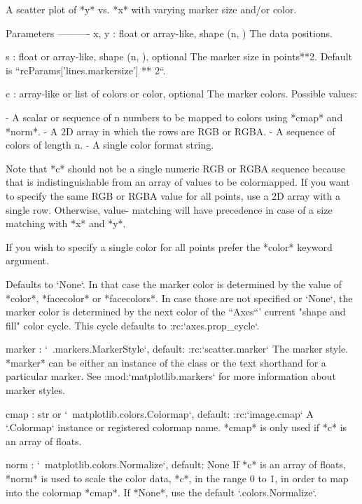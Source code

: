 \begin{DoxyVerb}
\begin{DoxyVerb}A scatter plot of *y* vs. *x* with varying marker size and/or color.

Parameters
----------
x, y : float or array-like, shape (n, )
    The data positions.

s : float or array-like, shape (n, ), optional
    The marker size in points**2.
    Default is ``rcParams['lines.markersize'] ** 2``.

c : array-like or list of colors or color, optional
    The marker colors. Possible values:

    - A scalar or sequence of n numbers to be mapped to colors using
      *cmap* and *norm*.
    - A 2D array in which the rows are RGB or RGBA.
    - A sequence of colors of length n.
    - A single color format string.

    Note that *c* should not be a single numeric RGB or RGBA sequence
    because that is indistinguishable from an array of values to be
    colormapped. If you want to specify the same RGB or RGBA value for
    all points, use a 2D array with a single row.  Otherwise, value-
    matching will have precedence in case of a size matching with *x*
    and *y*.

    If you wish to specify a single color for all points
    prefer the *color* keyword argument.

    Defaults to `None`. In that case the marker color is determined
    by the value of *color*, *facecolor* or *facecolors*. In case
    those are not specified or `None`, the marker color is determined
    by the next color of the ``Axes``' current "shape and fill" color
    cycle. This cycle defaults to :rc:`axes.prop_cycle`.

marker : `~.markers.MarkerStyle`, default: :rc:`scatter.marker`
    The marker style. *marker* can be either an instance of the class
    or the text shorthand for a particular marker.
    See :mod:`matplotlib.markers` for more information about marker
    styles.

cmap : str or `~matplotlib.colors.Colormap`, default: :rc:`image.cmap`
    A `.Colormap` instance or registered colormap name. *cmap* is only
    used if *c* is an array of floats.

norm : `~matplotlib.colors.Normalize`, default: None
    If *c* is an array of floats, *norm* is used to scale the color
    data, *c*, in the range 0 to 1, in order to map into the colormap
    *cmap*.
    If *None*, use the default `.colors.Normalize`.


\end{DoxyVerb}
\end{DoxyVerb}
